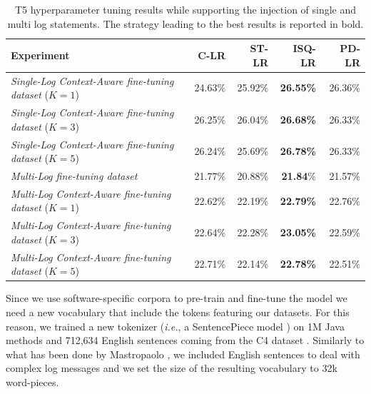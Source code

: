 \begin{table}[h!]
	\centering
	\caption{T5 hyperparameter tuning results while supporting the injection of single and multi log statements. The strategy leading to the best results is reported in bold.}
	\begin{tabular}{lrrrr}
		\toprule
		\textbf{Experiment}                  																		& \textbf{C-LR}              & \textbf{ST-LR}      & \textbf{ISQ-LR}        & \textbf{PD-LR} \\
		\midrule
		\textit{Single-Log Context-Aware fine-tuning dataset} ($K=1$)                         &   24.63\%                & 25.92\%    		           & \textbf{26.55\%}           &  26.36\%         \\
		\textit{Single-Log Context-Aware fine-tuning dataset} ($K=3$)                        &   26.25\%                & 26.04\%    		           & \textbf{26.68\%}          &  26.33\%         \\
		\textit{Single-Log Context-Aware fine-tuning dataset} ($K=5$)                         &  26.24\%                & 25.69\%    		           & \textbf{26.78\%}           &  26.33\%         \\
		\bottomrule
		\textit{Multi-Log fine-tuning dataset}                       										&   21.77\%                & 20.88\%    		           & \textbf{21.84}\%           &  21.57\%         \\
		\bottomrule
		\textit{Multi-Log Context-Aware fine-tuning dataset} ($K=1$)                         &   22.62\%                & 22.19\%    		           & \textbf{22.79\%}           &  22.76\%         \\
		\textit{Multi-Log Context-Aware fine-tuning dataset} ($K=3$)                        &   22.64\%                & 22.28\%    		           & \textbf{23.05\%}          &  22.59\%         \\
		\textit{Multi-Log Context-Aware fine-tuning dataset} ($K=5$)                         &   22.71\%                & 22.14\%    		           & \textbf{22.78\%}           &  22.51\%         \\
		\bottomrule
	\end{tabular}
	
	\label{tab:hp-results}
\end{table}

Since we use software-specific corpora to pre-train and fine-tune the model we need a new vocabulary that include the \java tokens featuring our datasets. For this reason, we trained a new tokenizer (\emph{i.e.}, a SentencePiece model \cite{kudo2018sentencepiece}) on 1M Java methods and 712,634 English sentences coming from the C4 dataset \cite{raffel2019exploring}. Similarly to what has been done by Mastropaolo \etal \cite{mastropaolo2022using}, we included English sentences to deal with complex log messages and we set the size of the resulting vocabulary to 32k word-pieces.

